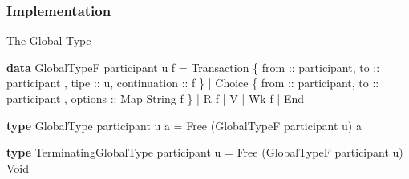 \documentclass[12pt]{beamer}
\newenvironment{Shaded}{}{}
\newcommand{\KeywordTok}[1]{\textcolor[rgb]{0.00,0.44,0.13}{\textbf{#1}}}
\newcommand{\DataTypeTok}[1]{\textcolor[rgb]{0.56,0.13,0.00}{#1}}
\newcommand{\OtherTok}[1]{\textcolor[rgb]{0.00,0.44,0.13}{#1}}
\newcommand{\FunctionTok}[1]{\textcolor[rgb]{0.02,0.16,0.49}{#1}}
\newcommand{\NormalTok}[1]{#1}
\begin{document}
\begin{frame}[fragile]
\frametitle{Implementation}
    The Global Type 

\begin{Shaded}
\begin{Highlighting}[]
\KeywordTok{data} \DataTypeTok{GlobalTypeF}\NormalTok{ participant u f}
    \FunctionTok{=} \DataTypeTok{Transaction} 
\NormalTok{        \{}\OtherTok{ from ::}\NormalTok{ participant,}\OtherTok{ to ::}\NormalTok{ participant}
\NormalTok{        ,}\OtherTok{ tipe ::}\NormalTok{ u,}\OtherTok{ continuation ::}\NormalTok{  f }
\NormalTok{        \} }
    \FunctionTok{|} \DataTypeTok{Choice} 
\NormalTok{        \{}\OtherTok{ from ::}\NormalTok{ participant,}\OtherTok{ to ::}\NormalTok{ participant}
\NormalTok{        ,}\OtherTok{ options ::} \DataTypeTok{Map} \DataTypeTok{String}\NormalTok{ f }
\NormalTok{        \}}
    \FunctionTok{|} \DataTypeTok{R}\NormalTok{ f}
    \FunctionTok{|} \DataTypeTok{V}
    \FunctionTok{|} \DataTypeTok{Wk}\NormalTok{ f}
    \FunctionTok{|} \DataTypeTok{End}
\end{Highlighting}
\end{Shaded}

\begin{Shaded}
\begin{Highlighting}[]
\KeywordTok{type} \DataTypeTok{GlobalType}\NormalTok{ participant u a }\FunctionTok{=} 
    \DataTypeTok{Free}\NormalTok{ (}\DataTypeTok{GlobalTypeF}\NormalTok{ participant u) a }
\end{Highlighting}
\end{Shaded}

\begin{Shaded}
\begin{Highlighting}[]
\KeywordTok{type} \DataTypeTok{TerminatingGlobalType}\NormalTok{ participant u }\FunctionTok{=} 
    \DataTypeTok{Free}\NormalTok{ (}\DataTypeTok{GlobalTypeF}\NormalTok{ participant u) }\DataTypeTok{Void}
\end{Highlighting}
\end{Shaded}

\end{frame}
\end{document}
